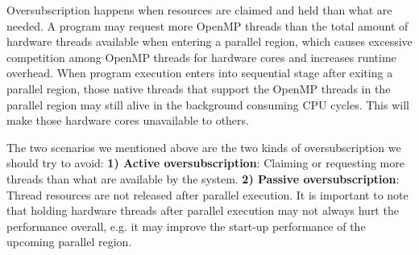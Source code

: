 Oversubscription happens when resources are claimed and held than what are needed.
A program may request more OpenMP threads than the total amount of hardware
threads available when entering a {\sf parallel} region, which causes excessive competition 
among OpenMP threads for hardware cores and increases runtime overhead. 
When program execution enters into sequential stage after exiting a {\sf parallel} region, 
those native threads that support the OpenMP threads in the parallel region may still 
alive in the background consuming CPU cycles. This 
will make those hardware cores unavailable to others. 


The two scenarios we mentioned above are the two kinds of oversubscription we should try to avoid:
{\bf 1) Active oversubscription}: Claiming or requesting more threads than 
what are available by the system.
{\bf 2) Passive oversubscription}: Thread resources are not released 
after parallel execution. It is important to note that holding hardware threads after parallel execution 
may not always hurt the performance overall, e.g. it may improve the start-up performance of the 
upcoming {\sf parallel} region. 


